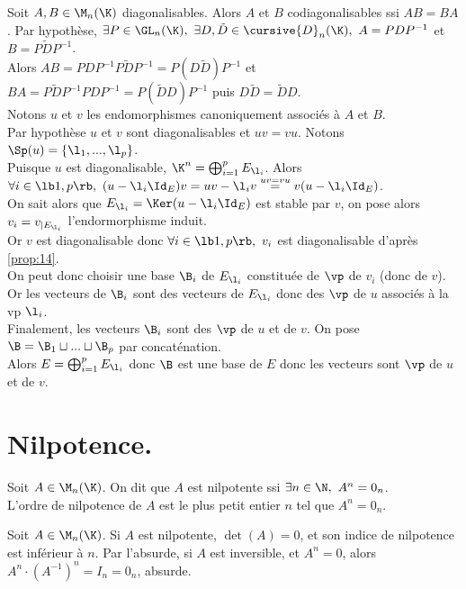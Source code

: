 \documentclass[11pt]{article}
\renewcommand*{\D}{\cursive{D}}
\begin{document}
\begin{prop}{}{}
    Soit $A,B\in\M_n(\K)$ diagonalisables. Alors $A$ et $B$ codiagonalisables ssi $AB=BA$.
    \tcblower
    \boxed{\ra} Par hypothèse, $\exists P \in \GL_n(\K), ~ \exists D,\tilde{D}\in\D_n(\K), ~ A=PDP^{-1}$ et $B=P\tilde{D}P^{-1}$.\\
    Alors $AB=PDP^{-1}P\tilde{D}P^{-1}=P(D\tilde{D})P^{-1}$ et $BA=P\tilde{D}P^{-1}PDP^{-1}=P(\tilde{D}D)P^{-1}$ puis $D\tilde{D}=\tilde{D}D$.\\
    \boxed{\la} Notons $u$ et $v$ les endomorphismes canoniquement associés à $A$ et $B$.\\
    Par hypothèse $u$ et $v$ sont diagonalisables et $uv=vu$. Notons $\Sp(u)=\{\l_1,...,\l_p\}$.\\
    Puisque $u$ est diagonalisable, $\K^n = \bigoplus_{i=1}^pE_{\l_i}$. Alors $\forall i \in \lb1,p\rb, ~ (u-\l_i\Id_E)v=uv-\l_iv\stackrel{uv=vu}{=}v(u-\l_i\Id_E)$.\\
    On sait alors que $E_{\l_i}=\Ker(u-\l_i\Id_E)$ est stable par $v$, on pose alors $v_i=v_{|E_{\l_i}}$ l'endormorphisme induit.\\
    Or $v$ est diagonalisable donc $\forall i \in \lb1,p\rb, ~ v_i$ est diagonalisable d'après \ref{prop:14}.\\
    On peut donc choisir une base $\B_i$ de $E_{\l_i}$ constituée de $\vp$ de $v_i$ (donc de $v$).\\
    Or les vecteurs de $\B_i$ sont des vecteurs de $E_{\l_i}$ donc des $\vp$ de $u$ associés à la vp $\l_i$.\\
    Finalement, les vecteurs $\B_i$ sont des $\vp$ de $u$ et de $v$. On pose $\B=\B_1\sqcup...\sqcup\B_p$ par concaténation.\\
    Alors $E=\bigoplus_{i=1}^pE_{\l_i}$ donc $\B$ est une base de $E$ donc les vecteurs sont $\vp$ de $u$ et de $v$.
\end{prop}

\section{Nilpotence.}

\begin{defi}{}{}
    Soit $A\in\M_n(\K)$. On dit que $A$ est nilpotente ssi $\exists n \in \N, ~ A^n = 0_{n}$.\\
    L'ordre de nilpotence de $A$ est le plus petit entier $n$ tel que $A^n=0_n$.
\end{defi}

\begin{prop}{}{}
    Soit $A\in\M_n(\K)$. Si $A$ est nilpotente, $\det(A)=0$, et son indice de nilpotence est inférieur à $n$.
    \tcblower
    Par l'absurde, si $A$ est inversible, et $A^n=0$, alors $A^n\cdot(A^{-1})^n = I_n = 0_n$, absurde.
\end{prop}
\end{document}
